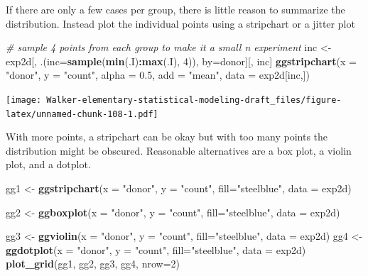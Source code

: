 \documentclass[]{book}
\newenvironment{Shaded}{\begin{snugshade}}{\end{snugshade}}
\newcommand{\CommentTok}[1]{\textcolor[rgb]{0.56,0.35,0.01}{\textit{#1}}}
\newcommand{\DataTypeTok}[1]{\textcolor[rgb]{0.13,0.29,0.53}{#1}}
\newcommand{\DecValTok}[1]{\textcolor[rgb]{0.00,0.00,0.81}{#1}}
\newcommand{\FloatTok}[1]{\textcolor[rgb]{0.00,0.00,0.81}{#1}}
\newcommand{\KeywordTok}[1]{\textcolor[rgb]{0.13,0.29,0.53}{\textbf{#1}}}
\newcommand{\NormalTok}[1]{#1}
\newcommand{\OperatorTok}[1]{\textcolor[rgb]{0.81,0.36,0.00}{\textbf{#1}}}
\newcommand{\StringTok}[1]{\textcolor[rgb]{0.31,0.60,0.02}{#1}}
\begin{document}
If there are only a few cases per group, there is little reason to summarize the distribution. Instead plot the individual points using a stripchart or a jitter plot

\begin{Shaded}
\begin{Highlighting}[]
\CommentTok{# sample 4 points from each group to make it a small n experiment}
\NormalTok{inc <-}\StringTok{ }\NormalTok{exp2d[, .(}\DataTypeTok{inc=}\KeywordTok{sample}\NormalTok{(}\KeywordTok{min}\NormalTok{(.I)}\OperatorTok{:}\KeywordTok{max}\NormalTok{(.I), }\DecValTok{4}\NormalTok{)), by=donor][, inc]}
\KeywordTok{ggstripchart}\NormalTok{(}\DataTypeTok{x =} \StringTok{"donor"}\NormalTok{,}
             \DataTypeTok{y =} \StringTok{"count"}\NormalTok{,}
             \DataTypeTok{alpha =} \FloatTok{0.5}\NormalTok{,}
             \DataTypeTok{add =} \StringTok{"mean"}\NormalTok{,}
             \DataTypeTok{data =}\NormalTok{ exp2d[inc,])}
\end{Highlighting}
\end{Shaded}

\texttt{[image: Walker-elementary-statistical-modeling-draft\_files/figure-latex/unnamed-chunk-108-1.pdf]}

With more points, a stripchart can be okay but with too many points the distribution might be obscured. Reasonable alternatives are a box plot, a violin plot, and a dotplot.

\begin{Shaded}
\begin{Highlighting}[]
\NormalTok{gg1 <-}\StringTok{ }\KeywordTok{ggstripchart}\NormalTok{(}\DataTypeTok{x =} \StringTok{"donor"}\NormalTok{,}
          \DataTypeTok{y =} \StringTok{"count"}\NormalTok{,}
          \DataTypeTok{fill=}\StringTok{"steelblue"}\NormalTok{,}
          \DataTypeTok{data =}\NormalTok{ exp2d)}

\NormalTok{gg2 <-}\StringTok{ }\KeywordTok{ggboxplot}\NormalTok{(}\DataTypeTok{x =} \StringTok{"donor"}\NormalTok{,}
          \DataTypeTok{y =} \StringTok{"count"}\NormalTok{,}
          \DataTypeTok{fill=}\StringTok{"steelblue"}\NormalTok{,}
          \DataTypeTok{data =}\NormalTok{ exp2d)}

\NormalTok{gg3 <-}\StringTok{ }\KeywordTok{ggviolin}\NormalTok{(}\DataTypeTok{x =} \StringTok{"donor"}\NormalTok{,}
          \DataTypeTok{y =} \StringTok{"count"}\NormalTok{,}
          \DataTypeTok{fill=}\StringTok{"steelblue"}\NormalTok{,}
          \DataTypeTok{data =}\NormalTok{ exp2d)}
\NormalTok{gg4 <-}\StringTok{ }\KeywordTok{ggdotplot}\NormalTok{(}\DataTypeTok{x =} \StringTok{"donor"}\NormalTok{,}
          \DataTypeTok{y =} \StringTok{"count"}\NormalTok{,}
          \DataTypeTok{fill=}\StringTok{"steelblue"}\NormalTok{,}
          \DataTypeTok{data =}\NormalTok{ exp2d)}
\KeywordTok{plot_grid}\NormalTok{(gg1, gg2, gg3, gg4, }\DataTypeTok{nrow=}\DecValTok{2}\NormalTok{)}
\end{Highlighting}
\end{Shaded}
\end{document}

